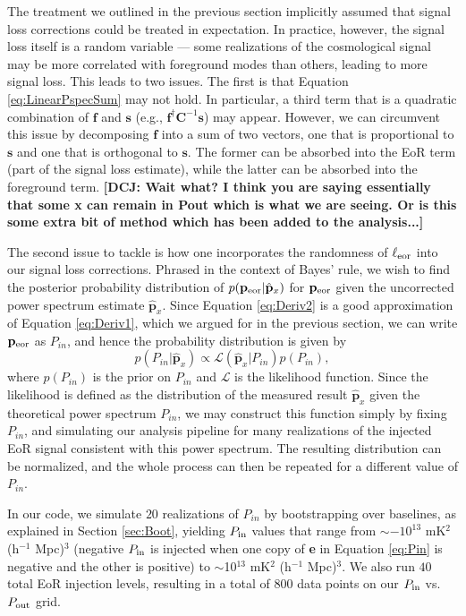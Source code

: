 \documentclass[preprint2,numberedappendix,tighten]{aastex6}  %
\newcommand{\f}{\mathbf{f}}
\newcommand{\s}{\mathbf{s}}
\newcommand{\p}{\mathbf{p}}
\newcommand{\phat}{\hat{\mathbf{p}}}
\newcommand{\C}{\mathbf{C}}
\newcommand{\dcj}[1]{{\color{orange} \textbf{[DCJ: #1]}}}
\begin{document}
The treatment we outlined in the previous section implicitly assumed that signal loss corrections could be treated in expectation. In practice, however, the signal loss itself is a random variable --- some realizations of the cosmological signal may be more correlated with foreground modes than others, leading to more signal loss. This leads to two issues. The first is that Equation \eqref{eq:LinearPspecSum} may not hold. In particular, a third term that is a quadratic combination of $\f$ and $\s$ (e.g., $\f^\dagger \C^{-1} \s$) may appear. However, we can circumvent this issue by decomposing $\f$ into a sum of two vectors, one that is proportional to $\s$ and one that is orthogonal to $\s$. The former can be absorbed into the EoR term (part of the signal loss estimate), while the latter can be absorbed into the foreground term. 
\dcj{Wait what? I think you are saying essentially that some x can remain in Pout which is what we are seeing. Or is this some extra bit of method which has been added to the analysis...}

The second issue to tackle is how one incorporates the randomness of $\ell_{\rm eor}$ into our signal loss corrections. Phrased in the context of Bayes' rule, we wish to find the posterior probability distribution of $p( \p_{\rm eor} | \phat_{x})$ for $\p_{\rm eor}$ given the uncorrected power spectrum estimate $\phat_{x}$. Since Equation \eqref{eq:Deriv2} is a good approximation of Equation \eqref{eq:Deriv1}, which we argued for in the previous section, we can write $\p_{\rm eor}$ as $P_{in}$, and hence the probability distribution is given by
\begin{equation}
\label{eq:Bayes}
p(P_{in} | \phat_{x}) \propto \mathcal{L} (  \phat_{x} | P_{in})  p(P_{in}),
\end{equation}
where $p(P_{in})$ is the prior on $P_{in}$ and $\mathcal{L} $ is the likelihood function. Since the likelihood is defined as the distribution of the measured result $ \phat_{x}$ given the theoretical power spectrum $P_{in}$, we may construct this function simply by fixing $P_{in}$, and simulating our analysis pipeline for many realizations of the injected EoR signal consistent with this power spectrum. The resulting distribution can be normalized, and the whole process can then be repeated for a different value of $P_{in}$. 

In our code, we simulate $20$ realizations of $P_{in}$ by bootstrapping over baselines, as explained in Section \ref{sec:Boot}, yielding $P_{\rm in}$ values that range from $\sim$$-10^{13}$ mK$^{2}$ (h$^{-1}$ Mpc)$^{3}$ (negative $P_{\rm in}$ is injected when one copy of \textbf{e} in Equation \eqref{eq:Pin} is negative and the other is positive) to $\sim$10$^{13}$ mK$^{2}$ (h$^{-1}$ Mpc)$^{3}$. We also run $40$ total EoR injection levels, resulting in a total of $800$ data points on our $P_{\rm in}$ vs. $P_{\rm out}$ grid. 
\end{document}
